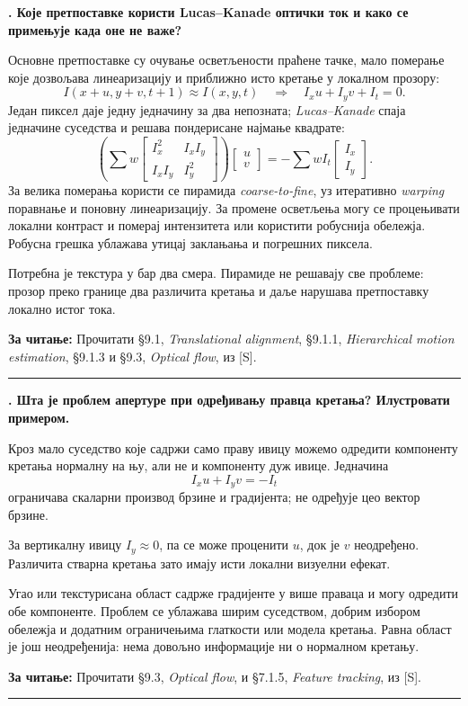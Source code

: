 \documentclass[10pt,a4paper]{article}
\newcommand{\en}[1]{\textit{#1}}
\newcounter{pitanje}
\newenvironment{odgovor}[1]{\stepcounter{pitanje}\begin{minipage}[t][0.455\textheight][t]{\textwidth}\vspace{0pt}\textbf{\thepitanje. #1}\par\smallskip}{\end{minipage}\par\ifodd\value{pitanje}\vspace{0.025\textheight}\hrule\vspace{0.015\textheight}\else\newpage\fi}
\newcommand{\izvor}[1]{\par\vfill{\footnotesize\textbf{За читање:} #1}\par}
\begin{document}
\begin{odgovor}{Које претпоставке користи Lucas--Kanade оптички ток и како се примењује када оне не важе?}
Основне претпоставке су очување осветљености праћене тачке, мало померање које дозвољава линеаризацију и приближно исто кретање у локалном прозору:
\[
I(x+u,y+v,t+1)\approx I(x,y,t)
\quad\Longrightarrow\quad I_xu+I_yv+I_t=0.
\]
Један пиксел даје једну једначину за два непозната; \en{Lucas--Kanade} спаја једначине суседства и решава пондерисане најмање квадрате:
\[
\left(\sum w
\begin{bmatrix}I_x^2&I_xI_y\\I_xI_y&I_y^2\end{bmatrix}\right)
\begin{bmatrix}u\\v\end{bmatrix}
=-\sum wI_t\begin{bmatrix}I_x\\I_y\end{bmatrix}.
\]
За велика померања користи се пирамида \en{coarse-to-fine}, уз итеративно \en{warping} поравнање и поновну линеаризацију. За промене осветљења могу се процењивати локални контраст и померај интензитета или користити робуснија обележја. Робусна грешка ублажава утицај заклањања и погрешних пиксела.

Потребна је текстура у бар два смера. Пирамиде не решавају све проблеме: прозор преко границе два различита кретања и даље нарушава претпоставку локално истог тока.
\izvor{Прочитати §9.1, \en{Translational alignment}, §9.1.1, \en{Hierarchical motion estimation}, §9.1.3 и §9.3, \en{Optical flow}, из [S].}
\end{odgovor}

\begin{odgovor}{Шта је проблем апертуре при одређивању правца кретања? Илустровати примером.}
Кроз мало суседство које садржи само праву ивицу можемо одредити компоненту кретања нормалну на њу, али не и компоненту дуж ивице. Једначина
\[
I_xu+I_yv=-I_t
\]
ограничава скаларни производ брзине и градијента; не одређује цео вектор брзине.
\begin{center}\end{center}
За вертикалну ивицу $I_y\approx0$, па се може проценити $u$, док је $v$ неодређено. Различита стварна кретања зато имају исти локални визуелни ефекат.

Угао или текстурисана област садрже градијенте у више праваца и могу одредити обе компоненте. Проблем се ублажава ширим суседством, добрим избором обележја и додатним ограничењима глаткости или модела кретања. Равна област је још неодређенија: нема довољно информације ни о нормалном кретању.
\izvor{Прочитати §9.3, \en{Optical flow}, и §7.1.5, \en{Feature tracking}, из [S].}
\end{odgovor}
\end{document}

